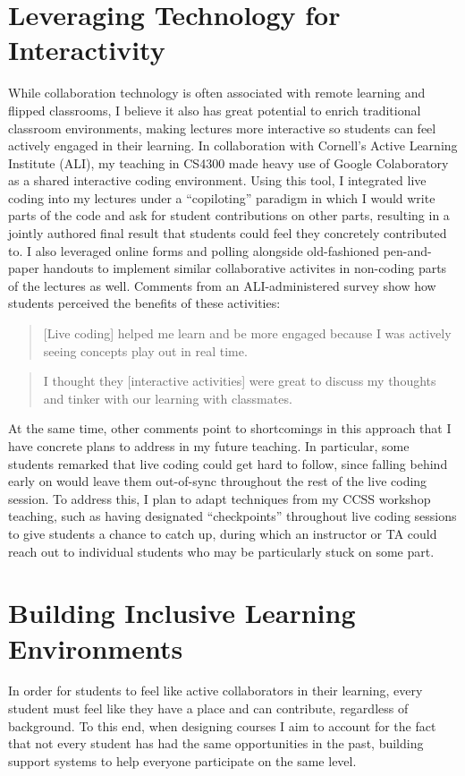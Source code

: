 \documentclass[12pt,letterpaper]{article}
\begin{document}
\section{Leveraging Technology for Interactivity}
While collaboration technology is often associated with remote learning and flipped classrooms, I believe it also has great potential to enrich traditional classroom environments, making lectures more interactive so students can feel actively engaged in their learning.
In collaboration with Cornell's Active Learning Institute (ALI), my teaching in CS4300 made heavy use of Google Colaboratory as a shared interactive coding environment.
Using this tool, I integrated live coding into my lectures under a ``copiloting'' paradigm in which I would write parts of the code and ask for student contributions on other parts, resulting in a jointly authored final result that students could feel they concretely contributed to.
I also leveraged online forms and polling alongside old-fashioned pen-and-paper handouts to implement similar collaborative activites in non-coding parts of the lectures as well.
Comments from an ALI-administered survey show how students perceived the benefits of these activities:

\begin{quote}
    [Live coding] helped me learn and be more engaged because I was actively seeing concepts play out in real time.
\end{quote}
\begin{quote}
    I thought they [interactive activities] were great to discuss my thoughts and tinker with our learning with classmates.
\end{quote}

At the same time, other comments point to shortcomings in this approach that I have concrete plans to address in my future teaching.
In particular, some students remarked that live coding could get hard to follow, since falling behind early on would leave them out-of-sync throughout the rest of the live coding session.
To address this, I plan to adapt techniques from my CCSS workshop teaching, such as having designated ``checkpoints'' throughout live coding sessions to give students a chance to catch up, during which an instructor
\ifliberalarts
%
\else
or TA
\fi
could reach out to individual students who may be particularly stuck on some part.
\interactionimprove

\section{Building Inclusive Learning Environments}
In order for students to feel like active collaborators in their learning, every student must feel like they have a place and can contribute, regardless of background.
To this end, when designing courses I aim to account for the fact that not every student has had the same opportunities in the past, building support systems to help everyone participate on the same level.
\end{document}
